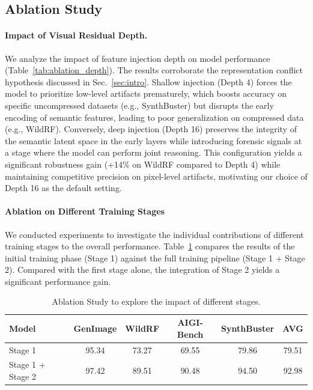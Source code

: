 \documentclass{article}
\theoremstyle{plain}
\theoremstyle{definition}
\theoremstyle{remark}
\begin{document}
\subsection{Ablation Study}

\paragraph{Impact of Visual Residual Depth.}
We analyze the impact of feature injection depth on model performance (Table~\ref{tab:ablation_depth}).
The results corroborate the representation conflict hypothesis discussed in Sec.~\ref{sec:intro}.
Shallow injection (Depth 4) forces the model to prioritize low-level artifacts prematurely, which boosts accuracy on specific uncompressed datasets (e.g., SynthBuster) but disrupts the early encoding of semantic features, leading to poor generalization on compressed data (e.g., WildRF).
Conversely, deep injection (Depth 16) preserves the integrity of the semantic latent space in the early layers while introducing forensic signals at a stage where the model can perform joint reasoning.
This configuration yields a significant robustness gain (+14\% on WildRF compared to Depth 4) while maintaining competitive precision on pixel-level artifacts, motivating our choice of Depth 16 as the default setting.





\paragraph{Ablation on Different Training Stages}
We conducted experiments to investigate the individual contributions of different training stages to the overall performance. Table~\ref{tab:ablation_stage} compares the results of the initial training phase (Stage 1) against the full training pipeline (Stage 1 + Stage 2). Compared with the first stage alone, the integration of Stage 2 yields a significant performance gain.

\begin{table}[t]
  \centering
  \tiny
  \caption{Ablation Study to explore the impact of different stages.}
  \label{tab:ablation_stage}
  \begin{tabular}{l|cccc|c}
    \toprule
    \textbf{Model} &GenImage &WildRF &AIGI-Bench &SynthBuster &\textbf{AVG} \\
    \midrule
    Stage 1 &95.34 &73.27 &69.55 &79.86 &79.51 \\
    Stage 1 + Stage 2 &97.42 &89.51 &90.48 &94.50 &92.98 \\
    \bottomrule
  \end{tabular}
\end{table}
\end{document}
